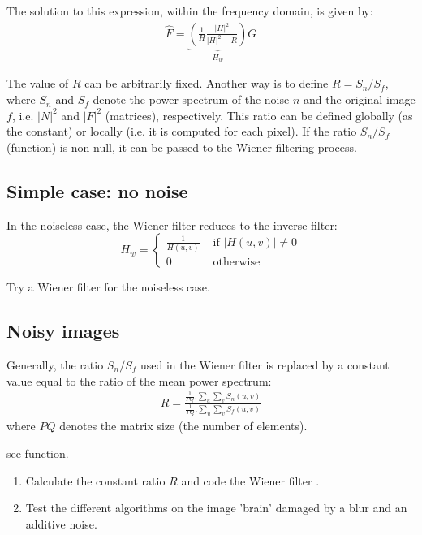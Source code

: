 The solution to this expression, within the frequency domain, is given by:
\begin{eqnarray*}
\hat{F}=\underbrace{\left(\frac{1}{H}\frac{|H|^2}{|H|^2+R}\right)}_{H_w}G
\end{eqnarray*}

The value of $R$ can be arbitrarily fixed. Another way is to define $R=S_n/S_f$, where $S_n$ and $S_f$ denote the power spectrum of the noise $n$ and the original image $f$, i.e. $|N|^2$ and $|F|^2$ (matrices), respectively. This ratio can be defined globally (as the constant) or locally (i.e. it is computed for each pixel). If the ratio $S_n/S_f$ (function) is non null, it can be passed to the Wiener filtering process.

\subsection{Simple case: no noise}

In the noiseless case, the Wiener filter reduces to the inverse filter:
$$
{H_w}=\left\{
\begin{array}{ll}
\displaystyle\frac{1}{H(u,v)}&\text{ if } |H(u,v)|\neq 0\\
0 & \text{ otherwise}
\end{array}
\right.
$$
\begin{qbox}
Try a Wiener filter for the noiseless case.
\end{qbox}

\subsection{Noisy images}

Generally, the ratio $S_n/S_f$ used in the Wiener filter is replaced by a constant value equal to the ratio of the mean power spectrum:
\begin{eqnarray}
R=\frac{\displaystyle\frac{1}{PQ}. \sum_u\sum_v S_n(u,v)}{\displaystyle\frac{1}{PQ}.\sum_u\sum_v S_f(u,v)}
\end{eqnarray}
where $PQ$ denotes the matrix size (the number of elements).

\begin{mcomment}
 \begin{mremark}
   see  function.
 \end{mremark}
\end{mcomment}

\begin{qbox}
\begin{enumerate}
	\item Calculate the constant ratio $R$ and code the Wiener filter .
	\item Test the different algorithms on the image 'brain' damaged by a blur and an additive noise.
\end{enumerate}
\end{qbox}



